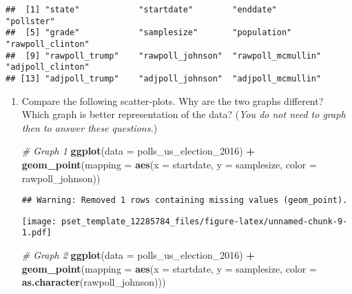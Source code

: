 \documentclass[
]{article}
\newenvironment{Shaded}{\begin{snugshade}}{\end{snugshade}}
\newcommand{\CommentTok}[1]{\textcolor[rgb]{0.56,0.35,0.01}{\textit{#1}}}
\newcommand{\DataTypeTok}[1]{\textcolor[rgb]{0.13,0.29,0.53}{#1}}
\newcommand{\DecValTok}[1]{\textcolor[rgb]{0.00,0.00,0.81}{#1}}
\newcommand{\KeywordTok}[1]{\textcolor[rgb]{0.13,0.29,0.53}{\textbf{#1}}}
\newcommand{\NormalTok}[1]{#1}
\newcommand{\OperatorTok}[1]{\textcolor[rgb]{0.81,0.36,0.00}{\textbf{#1}}}
\newcommand{\StringTok}[1]{\textcolor[rgb]{0.31,0.60,0.02}{#1}}
\begin{document}
\begin{verbatim}
##  [1] "state"            "startdate"        "enddate"          "pollster"        
##  [5] "grade"            "samplesize"       "population"       "rawpoll_clinton" 
##  [9] "rawpoll_trump"    "rawpoll_johnson"  "rawpoll_mcmullin" "adjpoll_clinton" 
## [13] "adjpoll_trump"    "adjpoll_johnson"  "adjpoll_mcmullin"
\end{verbatim}

\begin{enumerate}
\def\labelenumi{\arabic{enumi}.}
\item
  Compare the following scatter-plots. Why are the two graphs different?
  Which graph is better representation of the data?
  (\textit{You do not need to graph then to answer these questions.})

\begin{Shaded}
\begin{Highlighting}[]
\CommentTok{# Graph 1}
\KeywordTok{ggplot}\NormalTok{(}\DataTypeTok{data =}\NormalTok{ polls_us_election_}\DecValTok{2016}\NormalTok{) }\OperatorTok{+}
\StringTok{  }\KeywordTok{geom_point}\NormalTok{(}\DataTypeTok{mapping =} \KeywordTok{aes}\NormalTok{(}\DataTypeTok{x =}\NormalTok{ startdate, }
                           \DataTypeTok{y =}\NormalTok{ samplesize, }
                           \DataTypeTok{color =}\NormalTok{ rawpoll_johnson)) }
\end{Highlighting}
\end{Shaded}

\begin{verbatim}
## Warning: Removed 1 rows containing missing values (geom_point).
\end{verbatim}

  \texttt{[image: pset\_template\_12285784\_files/figure-latex/unnamed-chunk-9-1.pdf]}

\begin{Shaded}
\begin{Highlighting}[]
\CommentTok{# Graph 2}
\KeywordTok{ggplot}\NormalTok{(}\DataTypeTok{data =}\NormalTok{ polls_us_election_}\DecValTok{2016}\NormalTok{) }\OperatorTok{+}
\StringTok{  }\KeywordTok{geom_point}\NormalTok{(}\DataTypeTok{mapping =} \KeywordTok{aes}\NormalTok{(}\DataTypeTok{x =}\NormalTok{ startdate, }
                           \DataTypeTok{y =}\NormalTok{ samplesize, }
                           \DataTypeTok{color =} \KeywordTok{as.character}\NormalTok{(rawpoll_johnson)))}
\end{Highlighting}
\end{Shaded}


\end{enumerate}
\end{document}
